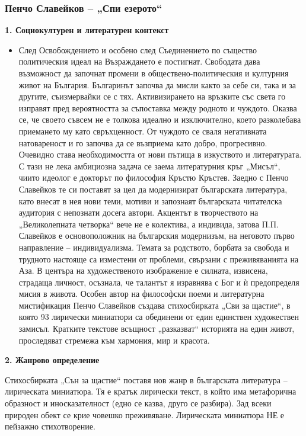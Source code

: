 \documentclass[12pt,a4paper]{article}
\begin{document}
\subsubsection{\colorbox{green!40}{Пенчо Славейков – „Спи езерото“}}
\textbf{1. Социокултурен и литературен контекст}
\vspace{0.1cm}
\begin{itemize}[leftmargin=*, noitemsep, topsep=2pt, parsep=0pt]
    \item След Освобождението и особено след Съединението по същество политическия идеал на Възраждането е постигнат. Свободата дава възможност да започнат промени в обществено-политическия и културния живот на България. Българинът започва да мисли както за себе си, така и за другите, съизмервайки се с тях. Активизирането на връзките със света го изправят пред вероятността за съпоставка между родното и чуждото. Оказва се, че своето съвсем не е толкова идеално и изключително, което разколебава приемането му като свръхценност. От чуждото се сваля негативната натовареност и го започва да се възприема като добро, прогресивно. Очевидно става необходимостта от нови пътища в изкуството и литературата. С тази не лека амбициозна задача се заема литературния кръг „Мисъл“, чиито идеолог е докторът по философия Кръстю Кръстев. Заедно с Пенчо Славейков те си поставят за цел да модернизират българската литература, като внесат в нея нови теми, мотиви и запознаят българската читателска аудитория с непознати досега автори. Акцентът в творчеството на „Великолепната четворка“ вече не е колектива, а индивида, затова П.П. Славейков е основоположник на българския модернизъм, на неговото първо направление – индивидуализма. Темата за родството, борбата за свобода и трудното настояще са изместени от проблеми, свързани с преживяванията на Аза. В центъра на художественото изображение е силната, извисена, страдаща личност, осъзнала, че талантът я изравнява с Бог и ѝ предопределя мисия в живота. Особен автор на философски поеми и литературна мистификация Пенчо Славейков създава стихосбирката „Сви за щастие“, в която 93 лирически миниатюри са обединени от един единствен художествен замисъл. Кратките текстове всъщност „разказват“ историята на един живот, проследяват стремежа към хармония, мир и красота.
\end{itemize}
\vspace{0.1cm}

\textbf{2. Жанрово определение}
\vspace{0.1cm}

\indent Стихосбирката „Сън за щастие“ поставя нов жанр в българската литература – лирическата миниатюра. Тя е кратък лирически текст, в който има метафорична образност и иносказателност (едно се казва, друго се разбира). Зад всеки природен обект се крие човешко преживяване. Лирическата миниатюра НЕ е пейзажно стихотворение.
\end{document}
